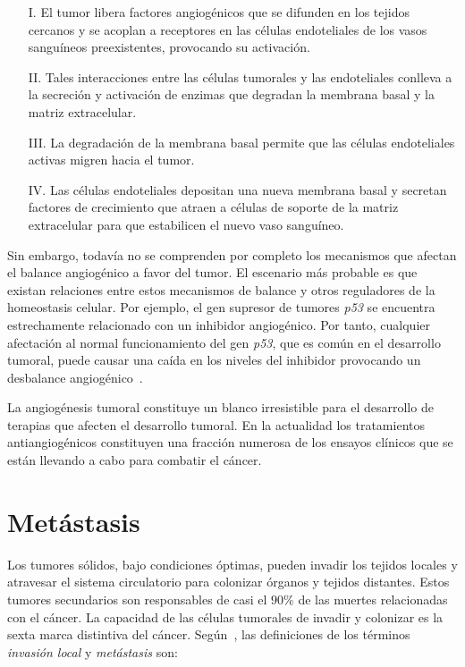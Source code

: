\begin{enumerate}
\item [I.] El tumor libera factores angiog\'enicos que se difunden en los tejidos cercanos y se acoplan a receptores en las c\'elulas endoteliales de los vasos sangu\'ineos preexistentes, provocando su activaci\'on.

\item [II.] Tales interacciones entre las c\'elulas tumorales y las endoteliales conlleva a la secreci\'on y activaci\'on de enzimas que degradan la membrana basal y la matriz extracelular.

\item [III.] La degradaci\'on de la membrana basal permite que las c\'elulas endoteliales activas migren hacia el tumor.

\item [IV.] Las c\'elulas endoteliales depositan una nueva membrana basal y secretan factores de crecimiento que atraen a c\'elulas de soporte de la matriz extracelular para que estabilicen el nuevo vaso sangu\'ineo.
\end{enumerate}

Sin embargo, todav\'ia no se comprenden por completo los mecanismos que afectan el balance angiog\'enico a favor del tumor. El escenario m\'as probable es que existan relaciones entre estos mecanismos de balance y otros reguladores de la homeostasis celular. Por ejemplo, el gen supresor de tumores \textit{p53} se encuentra estrechamente relacionado con un inhibidor angiog\'enico. Por tanto, cualquier afectaci\'on al normal funcionamiento del gen \textit{p53}, que es com\'un en el desarrollo tumoral, puede causar una ca\'ida en los niveles del inhibidor provocando un desbalance angiog\'enico~\cite{robins,hanahan,cancerbook}.

La angiog\'enesis tumoral constituye un blanco irresistible para el desarrollo de terapias que afecten el desarrollo tumoral. En la actualidad los tratamientos antiangiog\'enicos constituyen una fracci\'on numerosa de los ensayos cl\'inicos que se est\'an llevando a cabo para combatir el c\'ancer.

\section{Met\'astasis}
\label{subsec-meta}
Los tumores s\'olidos, bajo condiciones \'optimas, pueden invadir los tejidos locales y atravesar el sistema circulatorio para colonizar \'organos y tejidos distantes. Estos tumores secundarios son responsables de casi el $90\%$ de las muertes relacionadas con el c\'ancer. La capacidad de las c\'elulas tumorales de invadir y colonizar es la sexta marca distintiva del c\'ancer. Seg\'un~\cite{robins,hanahan}, las definiciones de los t\'erminos \textit{invasi\'on local} y \textit{met\'astasis} son:

